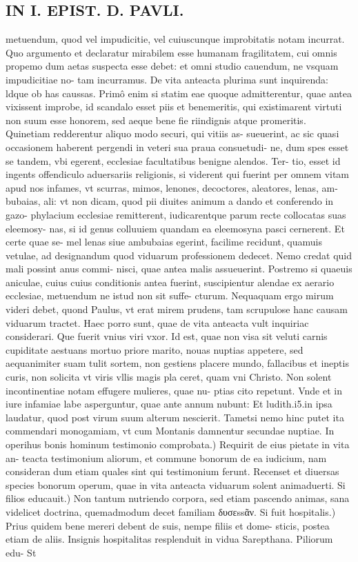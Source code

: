 \documentclass{article}
\begin{document}
\begin{pages}
\section*{IN I. EPIST. D. PAVLI. }
\marginpar{[ p.108 ]}\pstart metuendum, quod vel impudicitie, vel cuiuscunque improbitatis notam incurrat. Quo argumento et declaratur mirabilem esse humanam fragilitatem, cui omnis propemo dum aetas suspecta esse debet: et omni studio cauendum, ne vsquam impudicitiae no- tam incurramus. De vita anteacta plurima sunt inquirenda: ldque ob has caussas. Primô enim si statim eae quoque admitterentur, quae antea vixissent improbe, id scandalo esset piis et benemeritis, qui existimarent virtuti non suum esse honorem, sed aeque bene fie riindignis atque promeritis. Quinetiam redderentur aliquo modo securi, qui vitiis as- sueuerint, ac sic quasi occasionem haberent pergendi in veteri sua praua consuetudi- ne, dum spes esset se tandem, vbi egerent, ecclesiae facultatibus benigne alendos. Ter- tio, esset id ingents offendiculo aduersariis religionis, si viderent qui fuerint per omnem vitam apud nos infames, vt scurras, mimos, lenones, decoctores, aleatores, lenas, am- bubaias, ali: vt non dicam, quod pii diuites animum a dando et conferendo in gazo- phylacium ecclesiae remitterent, iudicarentque parum recte collocatas suas eleemosy- nas, si id genus colluuiem quandam ea eleemosyna pasci cernerent. Et certe quae se- mel lenas siue ambubaias egerint, facilime recidunt, quamuis vetulae, ad designandum quod viduarum professionem dedecet. Nemo credat quid mali possint anus commi- nisci, quae antea malis assueuerint. Postremo si quaeuis aniculae, cuius cuius conditionis antea fuerint, suscipientur alendae ex aerario ecclesiae, metuendum ne istud non sit suffe- cturum. Nequaquam ergo mirum videri debet, quond Paulus, vt erat mirem prudens, tam scrupulose hanc causam viduarum tractet. Haec porro sunt, quae de vita anteacta vult inquiriac considerari.  \pend\pstart Que fuerit vnius viri vxor. Id est, quae non visa sit veluti carnis cupiditate aestuans mortuo priore marito, nouas nuptias appetere, sed aequanimiter suam tulit sortem, non gestiens placere mundo, fallacibus et ineptis curis, non solicita vt viris vllis magis pla ceret, quam vni Christo. Non solent incontinentiae notam effugere mulieres, quae nu- ptias cito repetunt. Vnde et in iure infamiae labe asperguntur, quae ante annum nubunt: Et ludith.i5.in ipsa laudatur, quod post virum suum alterum nescierit. Tametsi nemo hinc putet ita commendari monogamiam, vt cum Montanis damnentur secundae nuptiae.  \pend\pstart In operihus bonis hominum testimonio comprobata.) Requirit de eius pietate in vita an- teacta testimonium aliorum, et commune bonorum de ea iudicium, nam consideran dum etiam quales sint qui testimonium ferunt. Recenset et diuersas species bonorum operum, quae in vita anteacta viduarum solent animaduerti.  \pend\pstart Si filios educauit.) Non tantum nutriendo corpora, sed etiam pascendo animas, sana videlicet doctrina, quemadmodum decet familiam δυσεssᾶν.  \pend\pstart Si fuit hospitalis.) Prius quidem bene mereri debent de suis, nempe filiis et dome- sticis, postea etiam de aliis. Insignis hospitalitas resplenduit in vidua Sarepthana.  \pend\pstart Piliorum edu- St 
\end{pages}
\end{document}
